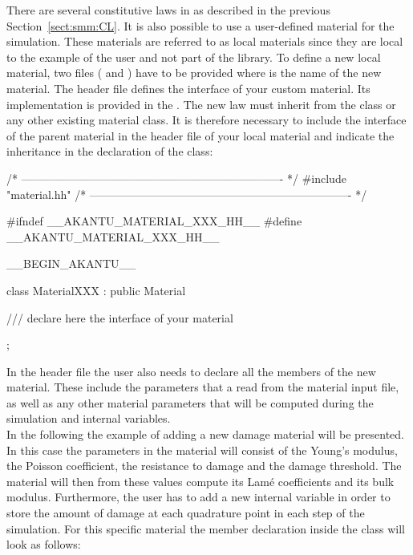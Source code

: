 There are several constitutive laws in \akantu as described in the
previous Section~\ref{sect:smm:CL}. It is also possible to use a
user-defined material for the simulation. These materials are referred
to as local materials since they are local to the example of the user
and not part of the \akantu library.  To define a new local material,
two files ( and ) have
to be provided where  is the name of the new material. The
header file  defines the interface of your
custom material. Its implementation is provided in the
. The new law must inherit from the
 class or any other existing material class. It is
therefore necessary to include the interface of the parent material
in the header file of your local material and indicate the inheritance
in the declaration of the class:
\begin{cpp}
/* ---------------------------------------------------------------------- */
#include "material.hh"
/* ---------------------------------------------------------------------- */

#ifndef __AKANTU_MATERIAL_XXX_HH__
#define __AKANTU_MATERIAL_XXX_HH__

__BEGIN_AKANTU__

class MaterialXXX : public Material {

/// declare here the interface of your material

};
\end{cpp}  
In the header file the user also needs to declare all the members of the new
material. These include the parameters that a read from the
material input file, as well as any other material parameters that will be computed during the simulation and internal variables.\\
In the following the example of adding a new damage material will be presented. In this
case the parameters in the material will consist of the Young's modulus, the
Poisson coefficient, the resistance to damage and the damage threshold. The
material will then from these values compute its Lam\'{e} coefficients and its
bulk modulus. Furthermore, the user has to add a new internal variable
 in order to store the amount of damage at each quadrature point in
each step of the simulation. For this specific material the member declaration
inside the class will look as follows:

